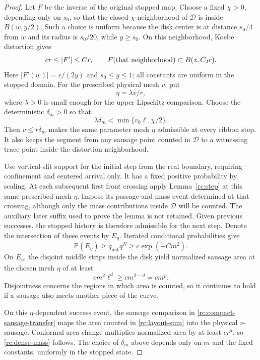 \documentclass[11pt]{article}
\theoremstyle{definition}
\theoremstyle{remark}
\numberwithin{equation}{section}
\begin{document}
\begin{proof}
Let $F$ be the inverse of the original stopped map. Choose a fixed
$\chi>0$, depending only on $s_0$, so that the closed
$\chi$-neighborhood of $\mathcal D$ is inside $B(w,y/2)$. Such a
choice is uniform because the disk center is at distance $s_0/4$
from $w$ and its radius is $s_0/20$, while $y\ge s_0$.
On this neighborhood, Koebe distortion gives
\[
 c r\le |F'|\le C r,
 \qquad F(\hbox{that neighborhood})\subset B(z,C_2r).
\]
Here $|F'(w)|=r/(2y)$ and $s_0\le y\le1$; all constants are uniform
in the stopped domain. For the prescribed physical mesh $v$, put
\[
                     \eta=\lambda v/r,
\]
where $\lambda>0$ is small enough for the upper Lipschitz comparison.
Choose the deterministic $\delta_m>0$ so that
\[
 \lambda\delta_m<\min\{v_0\ell,\chi/2\}.
\]
Then $v\le r\delta_m$ makes the same parameter mesh $\eta$ admissible
at every ribbon step. It also keeps the segment from any sausage point
counted in $\mathcal D$ to a witnessing trace point inside the
distortion neighborhood.

Use vertical-slit support for the initial step from the real boundary,
requiring confinement and centered arrival only.  It has a fixed
positive probability by scaling.  At each subsequent first front
crossing apply Lemma~\ref{rc:step} at this same prescribed mesh
$\eta$. Impose its passage-and-mass event determined at that crossing,
although only the mass contributions inside $\mathcal D$ will be
counted. The auxiliary later suffix used to prove the lemma is not
retained. Given previous successes, the stopped history is therefore
admissible for the next step. Denote the intersection of these events
by $E_\eta$.
Iterated conditional probabilities give
\[
 \mathbb P(E_\eta)\ge q_{\mathrm{init}}q^N
           \ge c\exp(-Cm^2).
\]
On $E_\eta$, the disjoint middle strips inside the disk yield
normalized sausage area at the chosen mesh $\eta$ of at least
\begin{equation}\label{rc:layout-sum}
 c m^2\ell^d\ge c m^{2-d}=c m^p.
\end{equation}
Disjointness concerns the regions in which area is counted, so it
continues to hold if a sausage also meets another piece of the curve.

On this $\eta$-dependent success event, the sausage comparison in
\eqref{rc:compact-sausage-transfer} maps the area counted in
\eqref{rc:layout-sum} into the physical $v$-sausage. Conformal area
change multiplies normalized area by at least $c r^d$, so
\eqref{rc:dense-mass} follows. The choice of $\delta_m$ above depends
only on $m$ and the fixed constants, uniformly in the stopped state.


\end{proof}
\end{document}
